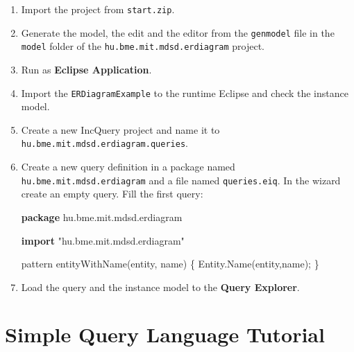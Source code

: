 \documentclass[]{report}
\newenvironment{Shaded}{}{}
\newcommand{\KeywordTok}[1]{\textcolor[rgb]{0.00,0.44,0.13}{\textbf{{#1}}}}
\newcommand{\FunctionTok}[1]{\textcolor[rgb]{0.02,0.16,0.49}{{#1}}}
\newcommand{\NormalTok}[1]{{#1}}
\begin{document}
\begin{enumerate}
\def\labelenumi{\arabic{enumi}.}
\item
  Import the project from \texttt{start.zip}.
\item
  Generate the model, the edit and the editor from the \texttt{genmodel}
  file in the \texttt{model} folder of the
  \texttt{hu.bme.mit.mdsd.erdiagram} project.
\item
  Run as \textbf{Eclipse Application}.
\item
  Import the \texttt{ERDiagramExample} to the runtime Eclipse and check
  the instance model.
\item
  Create a new IncQuery project and name it to
  \texttt{hu.bme.mit.mdsd.erdiagram.queries}.
\item
  Create a new query definition in a package named
  \texttt{hu.bme.mit.mdsd.erdiagram} and a file named
  \texttt{queries.eiq}. In the wizard create an empty query. Fill the
  first query:

\begin{Shaded}
\begin{Highlighting}[]
\KeywordTok{package} \NormalTok{hu.bme.mit.mdsd.erdiagram}

\KeywordTok{import} \NormalTok{"hu.bme.mit.mdsd.erdiagram"}

\NormalTok{pattern }\FunctionTok{entityWithName}\NormalTok{(entity, name) \{}
    \NormalTok{Entity.}\FunctionTok{Name}\NormalTok{(entity,name);}
\NormalTok{\}}
\end{Highlighting}
\end{Shaded}
\item
  Load the query and the instance model to the \textbf{Query Explorer}.
\end{enumerate}

\section{Simple Query Language Tutorial}
\end{document}
